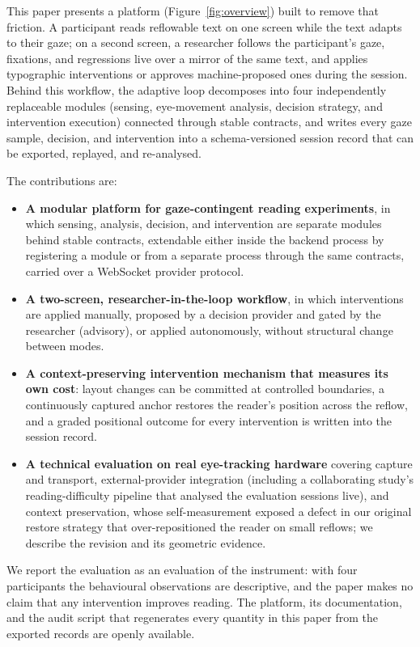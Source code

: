 This paper presents a platform (Figure~\ref{fig:overview}) built to remove that friction.
A participant reads reflowable text on one screen while the text adapts to their gaze; on a second screen, a researcher follows the participant's gaze, fixations, and regressions live over a mirror of the same text, and applies typographic interventions or approves machine-proposed ones during the session.
Behind this workflow, the adaptive loop decomposes into four independently replaceable modules (sensing, eye-movement analysis, decision strategy, and intervention execution) connected through stable contracts, and writes every gaze sample, decision, and intervention into a schema-versioned session record that can be exported, replayed, and re-analysed.

The contributions are:
\begin{itemize}
  \item \textbf{A modular platform for gaze-contingent reading experiments}, in which sensing, analysis, decision, and intervention are separate modules behind stable contracts, extendable either inside the backend process by registering a module or from a separate process through the same contracts, carried over a WebSocket provider protocol.
  \item \textbf{A two-screen, researcher-in-the-loop workflow}, in which interventions are applied manually, proposed by a decision provider and gated by the researcher (advisory), or applied autonomously, without structural change between modes.
  \item \textbf{A context-preserving intervention mechanism that measures its own cost}: layout changes can be committed at controlled boundaries, a continuously captured anchor restores the reader's position across the reflow, and a graded positional outcome for every intervention is written into the session record.
  \item \textbf{A technical evaluation on real eye-tracking hardware} covering capture and transport, external-provider integration (including a collaborating study's reading-difficulty pipeline that analysed the evaluation sessions live), and context preservation, whose self-measurement exposed a defect in our original restore strategy that over-repositioned the reader on small reflows; we describe the revision and its geometric evidence.
\end{itemize}

We report the evaluation as an evaluation of the instrument: with four participants the behavioural observations are descriptive, and the paper makes no claim that any intervention improves reading.
The platform, its documentation, and the audit script that regenerates every quantity in this paper from the exported records are openly available.
